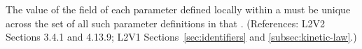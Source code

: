 The value of the  field of each parameter defined locally within
a \KineticLaw must be unique across the set of all such parameter
definitions in that \KineticLaw.  (References: L2V2 Sections 3.4.1 and
4.13.9; L2V1 Sections~\ref{sec:identifiers} and \ref{subsec:kinetic-law}.)
